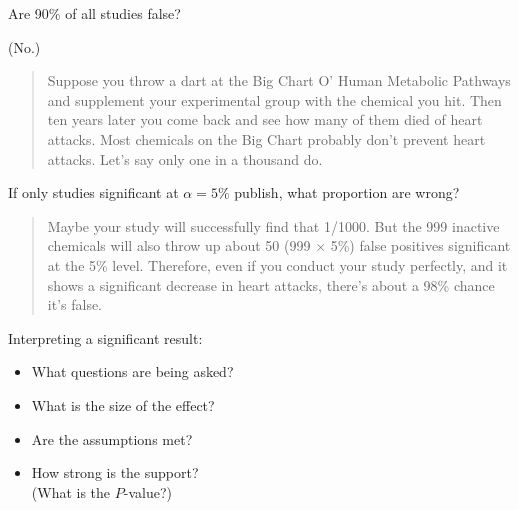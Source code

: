 \begin{frame}{Are 90\% of all studies false?}

        (No.)

    \vspace{2em}
    \pause

    \begin{quote}
        \small
        Suppose you throw a dart at the Big Chart O' Human Metabolic Pathways and supplement your experimental group with the chemical you hit. Then ten years later you come back and see how many of them died of heart attacks.
        Most chemicals on the Big Chart probably don't prevent heart attacks. Let's say only one in a thousand do. 
    \end{quote}

    \vspace{1em}

    If only studies significant at $\alpha=5\%$ publish,
    what proportion are wrong?

    \vspace{1em}
        
    \begin{quote}
        \pause Maybe your study will successfully find that 1/1000. But the 999 inactive chemicals will also throw up about 50 (999 $\times$ 5\%) false positives significant at the 5\% level. Therefore, even if you conduct your study perfectly, and it shows a significant decrease in heart attacks, there's about a 98\% chance it's false.
    \end{quote}


\end{frame}

\begin{frame}{Interpreting a significant result:}

    \begin{itemize}
        \item What questions are being asked?
        \item What is the size of the effect?
        \item Are the assumptions met?
        \item How strong is the support?  \\
          (What is the $P$-value?)
    \end{itemize}

\end{frame}

